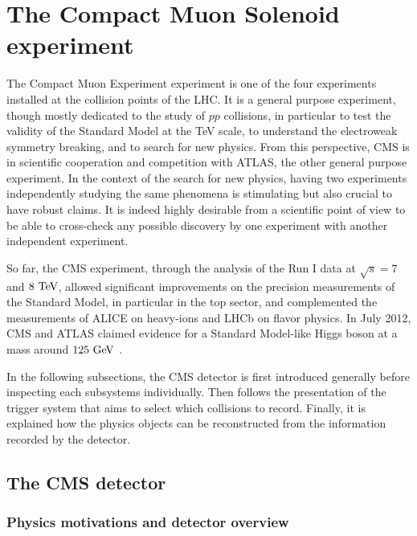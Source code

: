     \section{The Compact Muon Solenoid experiment \label{sec:CMSexperiment}}

    The Compact Muon Experiment experiment is one of the four experiments installed
    at the collision points of the LHC. It is a general purpose experiment, though mostly dedicated
    to the study of $pp$ collisions, in particular to test the validity of the Standard
    Model at the TeV scale, to understand the electroweak symmetry breaking, and to search for new physics. From this
    perspective, CMS is in scientific cooperation and competition with ATLAS, the
    other general purpose experiment. In the context of the search for new physics,
    having two experiments independently studying the same phenomena is
    stimulating but also crucial to have robust claims. It is indeed highly desirable
    from a scientific point of view to be able to cross-check any possible discovery
    by one experiment with another independent experiment.

    So far, the CMS experiment, through the analysis of the Run I data at
    $\sqrt{s} = 7$ and $8~\text{TeV}$, allowed significant improvements on the precision measurements
    of the Standard Model, in particular in the top sector, and complemented the
    measurements of ALICE on heavy-ions and LHCb on flavor physics. In July 2012, CMS
    and ATLAS claimed evidence for a Standard Model-like Higgs boson at a mass around
    $125~\text{GeV}$ \cite{CMSHiggs, ATLASHiggs}.

    In the following subsections, the CMS detector is first introduced generally before inspecting
    each subsystems individually. Then follows the presentation of the trigger system
    that aims to select which collisions to record. Finally, it is
    explained how the physics objects can be reconstructed from the information
    recorded by the detector.

    \subsection{The CMS detector}

        \subsubsection{Physics motivations and detector overview}

